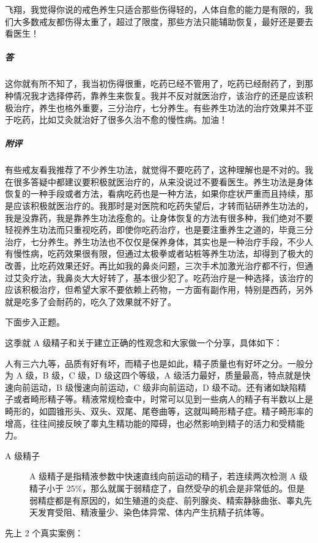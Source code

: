 \begin{case}
    飞翔，我觉得你说的戒色养生只适合那些伤得轻的，人体自愈的能力是有限的，我们大多数戒友都伤得太重了，超过了限度，那些方法只能辅助恢复，最好还是要去看医生！
    \subparagraph{答} 这你就有所不知了，我当初伤得很重，吃药已经不管用了，吃药已经耐药了，到那种情况我才选择停药，靠养生来恢复。我并不反对就医治疗，该治疗的还是应该积极治疗，养生也格外重要，三分治疗，七分养生。有些养生功法的治疗效果并不亚于吃药，比如艾灸就治好了很多久治不愈的慢性病。加油！
    \subparagraph{附评} 有些戒友看我推荐了不少养生功法，就觉得不要吃药了，这种理解也是不对的。我在很多答疑中都建议要积极就医治疗的，从来没说过不要看医生。养生功法是身体恢复的一种手段或者方法，看病吃药也是一种方法，如果你症状严重而且持续，那是应该积极就医治疗的。我那时是对医院和吃药失望后，才转而钻研养生功法的，我是没靠药，我是靠养生功法痊愈的。让身体恢复的方法有很多种，我们绝对不要轻视养生功法而只重视吃药，即使你吃药治疗，也是要注重养生之道的，毕竟三分治疗，七分养生。养生功法也不仅仅是保养身体，其实也是一种治疗手段，不少人有慢性病，吃药效果很有限，但通过太极拳或者站桩等养生功法，却得到了极大的改善，比吃药效果还好。再比如我的鼻炎问题，三次手术加激光治疗都不行，但通过艾灸疗法，我鼻炎大大好转了，基本很少犯了。吃药治疗是一种选择，该治疗的应该积极治疗，但希望大家不要依赖上药物，一方面有副作用，特别是西药，另外就是吃多了会耐药的，吃久了效果就不好了。
\end{case}

下面步入正题。

这季就 A 级精子和关于建立正确的性观念和大家做一个分享，具体如下：

人有三六九等，品质有好有坏，而精子也是如此，精子质量也有好坏之分。一般分为 A 级，B 级，C 级，D 级这四个等级，A 级活力最好，质量最高，特点就是快速向前运动，B 级慢速向前运动，C 级非向前运动，D 级不动。还有诸如缺陷精子或者畸形精子等。精液常规检查中，时常可以见到一些病人的精子有半数以上是畸形的，如圆锥形头、双头、双尾、尾卷曲等，这就叫畸形精子症。精子畸形率的增高，往往间接反映了睾丸生精功能的障碍，也必然影响到精子的活力和受精能力。

\begin{description}
    \item[A 级精子] A 级精子是指精液参数中快速直线向前运动的精子，若连续两次检测 A 级精子小于 25\%，那么就属于弱精症了，自然受孕的机会是非常低的。但是弱精症都是有原因的，如生殖道的炎症、前列腺炎、精索静脉曲张、睾丸先天发育受阻、精液量少、染色体异常、体内产生抗精子抗体等。
\end{description}

先上 2 个真实案例：

